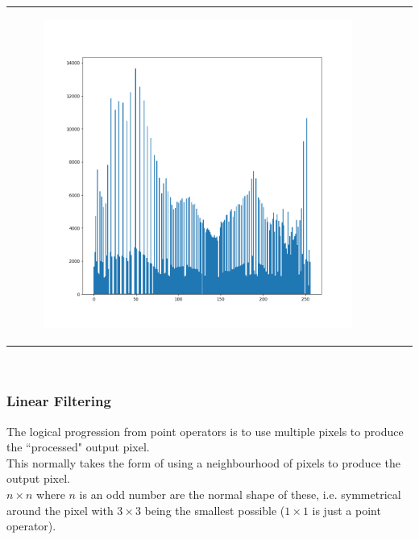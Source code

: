 \begin{frame}
\begin{tabular}{ccc}
\begin{minipage}{0.3\textwidth}
\begin{figure}[H]
	    \includegraphics[width=\textwidth]{images/histoEqualised.png}
	     \end{figure}
        \end{minipage}\\
       
        
    \end{tabular}\\



\end{frame}

\begin{frame}\frametitle{Linear Filtering}
The logical progression from point operators is to use multiple pixels to produce the ``processed" output pixel.\\ This normally takes the form of using a neighbourhood of pixels to produce the output pixel. \\$n\times n$ where $n$ is an odd number are the normal shape of these, i.e. symmetrical around the pixel with $3\times3$ being the smallest possible ($1\times1$ is just a point operator). 
\end{frame}

